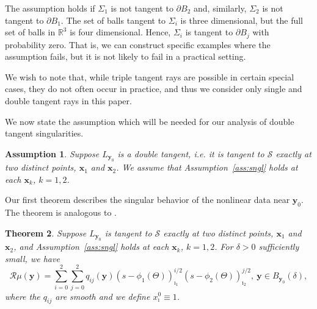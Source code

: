 \documentclass[11pt]{article}
\newcommand{\be}{\begin{equation}}
\newcommand{\ee}{\end{equation}}
\newcommand{\s}{\mathcal S}
\newcommand{\br}{\mathbb{R}}
\numberwithin{equation}{section}
\newcommand{\vy}{\mathbf{y}}
\newcommand{\vx}{\mathbf{x}}
\newtheorem{theorem}{Theorem}[section]
\newtheorem{assumption}[theorem]{Assumption}
\theoremstyle{definition}
\begin{document}
The assumption holds if $\Sigma_1$ is not tangent to $\partial B_2$ and, similarly, $\Sigma_2$ is not tangent to $\partial B_1$. The set of balls tangent to $\Sigma_i$ is three dimensional, but the full set of balls in $\br^3$ is four dimensional. Hence, $\Sigma_i$ is tangent to $\partial B_j$ with probability zero. That is, we can construct specific examples where the assumption fails, but it is not likely to fail in a practical setting.\vspace{2mm}

We wish to note that, while triple tangent rays are possible in certain special cases, they do not often occur in practice, and thus we consider only single and double tangent rays in this paper.

We now state the assumption which will be needed for our analysis of double tangent singularities.

\begin{assumption}\label{ass:dbl}
Suppose $L_{\vy_0}$ is a double tangent, i.e. it is tangent to $\s$ exactly at two distinct points, $\vx_1$ and $\vx_2$. We assume that Assumption~\ref{ass:sngl} holds at each $\vx_k$, $k=1,2$.
\end{assumption}


Our first theorem describes the singular behavior of the nonlinear data near $\vy_0$. The theorem is analogous to \cite[Theorem 3.1]{katsevich2026}.

\begin{theorem}
\label{double_sing}
Suppose $L_{\vy_0}$ is tangent to $\s$ exactly at two distinct points, $\vx_1$ and $\vx_2$, and Assumption~\ref{ass:sngl} holds at each $\vx_k$, $k=1,2$. For $\delta > 0$ sufficiently small, we have
\be
\label{double_lin}
\mathcal{R}\mu(\vy) = \sum_{i=0}^2\sum_{j=0}^2q_{ij}(\vy)(s - \phi_1(\Theta))_{\imath_1}^{i/2}(s - \phi_2(\Theta))_{\imath_2}^{j/2},\ \vy\in B_{\vy_0}(\delta),
\ee
where the $q_{ij}$ are smooth and we define $x_\imath^0 \equiv 1$. 
\end{theorem}
\end{document}
